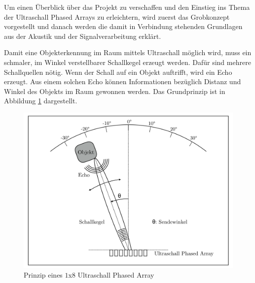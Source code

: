 Um einen Überblick über das Projekt zu verschaffen und den Einstieg ins Thema der Ultraschall Phased Arrays zu erleichtern, wird zuerst das Grobkonzept vorgestellt und danach werden die damit in Verbindung stehenden Grundlagen aus der Akustik und der Signalverarbeitung erklärt.

Damit eine Objekterkennung im Raum mittels Ultraschall möglich wird, muss ein schmaler, im Winkel verstellbarer Schallkegel erzeugt werden. Dafür sind mehrere Schallquellen nötig. Wenn der Schall auf ein Objekt auftrifft, wird ein Echo erzeugt. Aus einem solchen Echo können Informationen bezüglich Distanz und Winkel des Objekts im Raum gewonnen werden. Das Grundprinzip ist in Abbildung \ref{fig:image_grundlagen_prinzip} dargestellt.

\begin{figure}[htb]
\begin{center}
\includegraphics[width=\textwidth]{graphics/image_grundlagen_prinzip.png}
\end{center}
\caption{Prinzip eines $1$x$8$ Ultraschall Phased Array} %
\label{fig:image_grundlagen_prinzip}
\end{figure}
%



